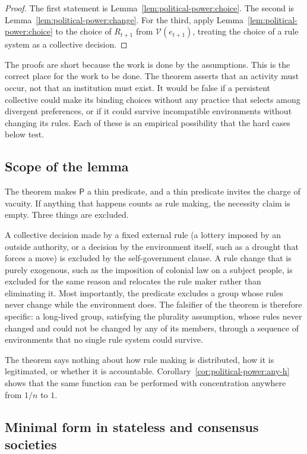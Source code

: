 \documentclass[11pt,letterpaper]{article}
\theoremstyle{definition}
\theoremstyle{remark}
\newcommand{\pP}{\mathsf{P}}
\begin{document}
\begin{proof}
The first statement is Lemma~\ref{lem:political-power:choice}. The second is Lemma~\ref{lem:political-power:change}. For the third, apply Lemma~\ref{lem:political-power:choice} to the choice of $R_{t+1}$ from $\mathcal{V}(e_{t+1})$, treating the choice of a rule system as a collective decision.
\end{proof}

The proofs are short because the work is done by the assumptions. This is the correct place for the work to be done. The theorem asserts that an activity must occur, not that an institution must exist. It would be false if a persistent collective could make its binding choices without any practice that selects among divergent preferences, or if it could survive incompatible environments without changing its rules. Each of these is an empirical possibility that the hard cases below test.

\subsection{Scope of the lemma}

The theorem makes $\pP$ a thin predicate, and a thin predicate invites the charge of vacuity. If anything that happens counts as rule making, the necessity claim is empty. Three things are excluded.

A collective decision made by a fixed external rule (a lottery imposed by an outside authority, or a decision by the environment itself, such as a drought that forces a move) is excluded by the self-government clause. A rule change that is purely exogenous, such as the imposition of colonial law on a subject people, is excluded for the same reason and relocates the rule maker rather than eliminating it. Most importantly, the predicate excludes a group whose rules never change while the environment does. The falsifier of the theorem is therefore specific: a long-lived group, satisfying the plurality assumption, whose rules never changed and could not be changed by any of its members, through a sequence of environments that no single rule system could survive.

The theorem says nothing about how rule making is distributed, how it is legitimated, or whether it is accountable. Corollary~\ref{cor:political-power:any-h} shows that the same function can be performed with concentration anywhere from $1/n$ to $1$.

\subsection{Minimal form in stateless and consensus societies}
\end{document}
